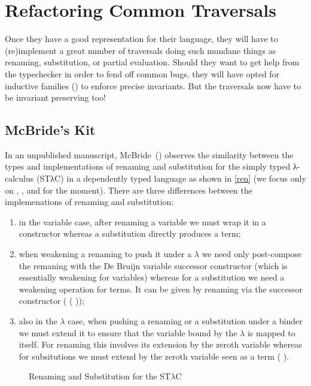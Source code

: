 \chapter{Refactoring Common Traversals}

Once they have a good representation for their language, they will have to
(re)implement a great number of traversals doing such mundane things as
renaming, substitution, or partial evaluation. Should they want to get help
from the typechecker in order to fend off common bugs, they will have opted
for inductive families (\cite{dybjer1991inductive}) to enforce precise
invariants. But the traversals now have to be invariant preserving too!

\section{McBride's Kit}

In an unpublished manuscript, McBride~(\citeyear{mcbride2005type}) observes the
similarity between the types and implementations of renaming and substitution for
the simply typed λ-calculus (STλC) in a dependently typed language as shown in
\cref{ren} (we focus only on , , and  for the moment).
There are three differences between the implemenations of renaming and substitution:

\begin{enumerate}
  \item
    in the variable case, after renaming a variable we must wrap it
    in a  constructor whereas a substitution directly
    produces a term;
  \item
    when weakening a renaming to push it under a $λ$ we need only
    post-compose the remaning with the De Bruijn variable successor
    constructor  (which is essentially weakening for variables)
    whereas for a substitution we need a weakening operation for terms.
    It can be given by renaming via the successor constructor
    ( ( ));
  \item
    also in the $λ$ case, when pushing a renaming or a substitution under
    a binder we must extend it to ensure that the variable bound by the
    $λ$ is mapped to itself. For renaming this involves its extension by
    the zeroth variable  whereas for subsitutions we must extend by
    the zeroth variable seen as a term ( ).
\end{enumerate}

\begin{figure}[h]
\caption{Renaming\label{ren} and Substitution\label{sub} for the ST$λ$C}
\end{figure}

